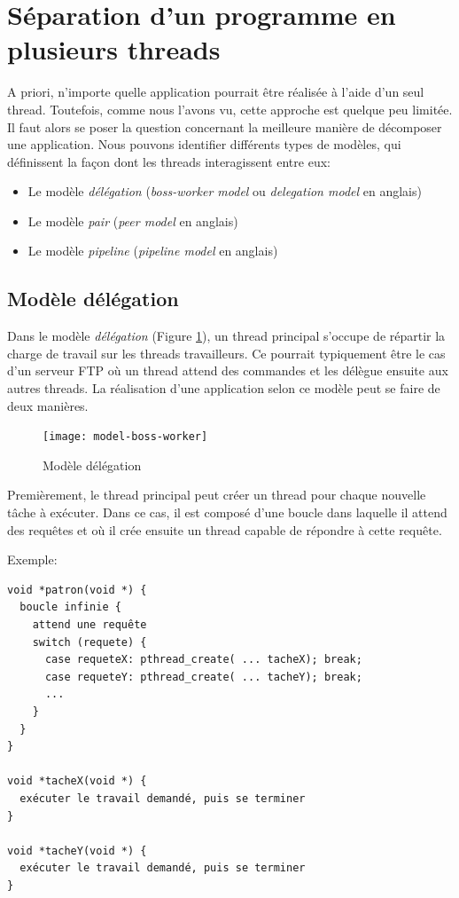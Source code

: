 \section{Séparation d'un programme en plusieurs threads}

A priori, n'importe quelle application pourrait être réalisée à l'aide d'un seul thread. Toutefois, comme nous l'avons vu, cette approche est quelque peu limitée. Il faut alors se poser la question concernant la meilleure manière de décomposer une application. Nous pouvons identifier différents types de modèles, qui définissent la façon dont les threads interagissent entre eux:

\begin{itemize}
\item Le modèle \emph{délégation} (\emph{boss-worker model} ou \emph{delegation model} en anglais)
\item Le modèle \emph{pair} (\emph{peer model} en anglais)
\item Le modèle \emph{pipeline} (\emph{pipeline model} en anglais)
\end{itemize}

\subsection{Modèle délégation}

Dans le modèle \emph{délégation} (Figure \ref{fig:model-boss-worker}), un thread principal s'occupe de répartir la charge de travail sur les threads travailleurs. Ce pourrait typiquement être le cas d'un serveur FTP où un thread attend des commandes et les délègue ensuite aux autres threads. La réalisation d'une application selon ce modèle peut se faire de deux manières.


\begin{figure}[ht]
  \begin{center}
    \texttt{[image: model-boss-worker]}
    \caption{\label{fig:model-boss-worker}Modèle délégation}
  \end{center}
\end{figure}

Premièrement, le thread principal peut créer un thread pour chaque nouvelle tâche à exécuter. Dans ce cas, il est composé d'une boucle dans laquelle il attend des requêtes et où il crée ensuite un thread capable de répondre à cette requête.

\newpage

Exemple:

\begin{lstlisting}[frame=trBL]
void *patron(void *) {
  boucle infinie {
    attend une requête
    switch (requete) {
      case requeteX: pthread_create( ... tacheX); break;
      case requeteY: pthread_create( ... tacheY); break;
      ...
    }
  }
}

void *tacheX(void *) {
  exécuter le travail demandé, puis se terminer
}

void *tacheY(void *) {
  exécuter le travail demandé, puis se terminer
}
\end{lstlisting}

